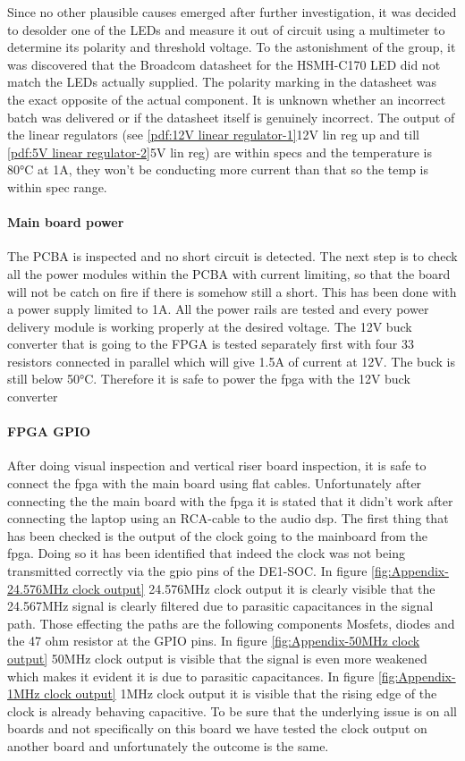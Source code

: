 Since no other plausible causes emerged after further investigation, it was decided to desolder one of the LEDs and measure it out of circuit using a multimeter to determine its polarity and threshold voltage. To the astonishment of the group, it was discovered that the Broadcom datasheet for the HSMH-C170 LED did not match the LEDs actually supplied. The polarity marking in the datasheet was the exact opposite of the actual component. It is unknown whether an incorrect batch was delivered or if the datasheet itself is genuinely incorrect.
The output of the linear regulators (see \ref{pdf:12V linear regulator-1}12V lin reg up and till \ref{pdf:5V linear regulator-2}5V lin reg) are within specs and the temperature is 80°C at 1A, they won't be conducting more current than that so the temp is within spec range.

\paragraph{Main board power}
The PCBA is inspected and no short circuit is detected. The next step is to check all the power modules within the PCBA with current limiting, so that the board will not be catch on fire if there is somehow still a short. This has been done with a power supply limited to 1A. All the power rails are tested and every power delivery module is working properly at the desired voltage. The 12V buck converter that is going to the FPGA is tested separately first with four 33 resistors connected in parallel which will give 1.5A of current at 12V. The buck is still below 50°C. Therefore it is safe to power the fpga with the 12V buck converter

\paragraph{FPGA GPIO}
After doing visual inspection and vertical riser board inspection, it is safe to connect the fpga with the main board using flat cables. Unfortunately after connecting the the main board with the fpga it is stated that it didn't work after connecting the laptop using an RCA-cable to the audio dsp. The first thing that has been checked is the output of the clock going to the mainboard from the fpga. Doing so it has been identified that indeed the clock was not being transmitted correctly via the gpio pins of the DE1-SOC. In figure \ref{fig:Appendix-24.576MHz clock output} 24.576MHz clock output it is clearly visible that the 24.567MHz signal is clearly filtered due to parasitic capacitances in the signal path. Those effecting the paths are the following components Mosfets, diodes and the 47 ohm resistor at the GPIO pins. In figure \ref{fig:Appendix-50MHz clock output} 50MHz clock output is visible that the signal is even more weakened which makes it evident it is due to parasitic capacitances. In figure \ref{fig:Appendix-1MHz clock output} 1MHz clock output it is visible that the rising edge of the clock is already behaving capacitive. To be sure that the underlying issue is on all boards and not specifically on this board we have tested the clock output on another board and unfortunately the outcome is the same.

